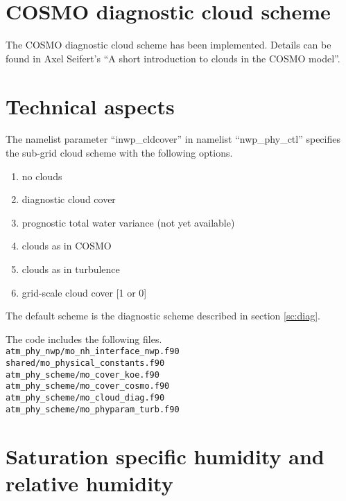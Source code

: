 \documentclass[a4paper,11pt]{article}
\begin{document}

\section{COSMO diagnostic cloud scheme}

The COSMO diagnostic cloud scheme has been implemented.  Details can be found in 
Axel Seifert's ``A short introduction to clouds in the COSMO model''.

\section{Technical aspects}

The namelist parameter ``inwp\_cldcover''
in namelist ``nwp\_phy\_ctl'' specifies the sub-grid cloud scheme with the following options.
\begin{enumerate}[start=0]
\item no clouds
\item diagnostic cloud cover
\item prognostic total water variance (not yet available)
\item clouds as in COSMO
\item clouds as in turbulence
\item grid-scale cloud cover [1 or 0]
\end{enumerate}
The default scheme is the diagnostic scheme described in section \ref{sc:diag}.

The code includes the following files.\\
\verb|atm_phy_nwp/mo_nh_interface_nwp.f90 |\\
\verb|shared/mo_physical_constants.f90    |\\
\verb|atm_phy_scheme/mo_cover_koe.f90     |\\
\verb|atm_phy_scheme/mo_cover_cosmo.f90   |\\
\verb|atm_phy_scheme/mo_cloud_diag.f90    |\\
\verb|atm_phy_scheme/mo_phyparam_turb.f90 |\\



\section{Saturation specific humidity and relative humidity}
\end{document}
